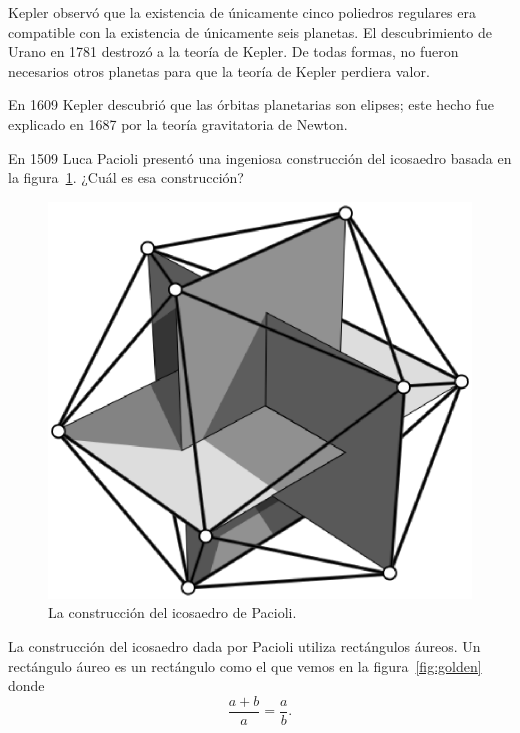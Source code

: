 Kepler observó que la existencia de únicamente cinco poliedros regulares era
compatible con la existencia de únicamente seis planetas. El descubrimiento de
Urano en 1781 destrozó a la teoría de Kepler. De todas formas, no fueron
necesarios otros planetas para que la teoría de Kepler perdiera valor. 

En 1609
Kepler descubrió que las órbitas planetarias son elipses; este hecho fue
explicado en 1687 por la teoría gravitatoria de Newton. 



\begin{exercise}
	En 1509 Luca Pacioli presentó una ingeniosa construcción del icosaedro
	basada en la figura~\ref{fig:Pacioli}.  ¿Cuál es esa construcción?
\end{exercise}

\begin{figure}
   \centering
   \includegraphics[scale=0.3]{images/pacioli}
   \caption{La construcción del icosaedro de Pacioli.}
   \label{fig:Pacioli}
\end{figure}

La construcción del icosaedro dada por Pacioli utiliza rectángulos áureos. Un
rectángulo áureo es un rectángulo como el que vemos en la
figura~\ref{fig:golden} donde 
\[
	\frac{a+b}{a}=\frac{a}{b}.
\]

